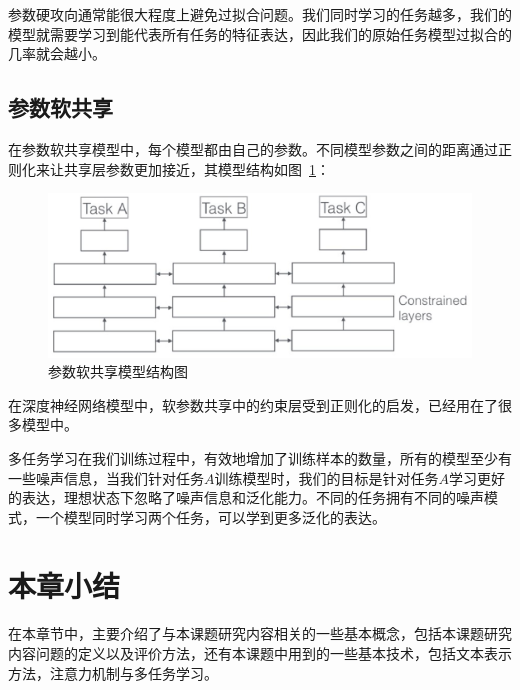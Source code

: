 参数硬攻向通常能很大程度上避免过拟合问题。我们同时学习的任务越多，我们的模型就需要学习到能代表所有任务的特征表达，因此我们的原始任务模型过拟合的几率就会越小。

\subsection{参数软共享}
在参数软共享模型中，每个模型都由自己的参数。不同模型参数之间的距离通过正则化来让共享层参数更加接近，其模型结构如图~\ref{fig:soft_share}：

\begin{figure}[htb]
    \centering
    \includegraphics[scale=0.5, clip=true]{./sources/rel_soft_share.eps}
    \vspace{-10pt}
    \caption{\label{fig:soft_share} 参数软共享模型结构图}
    \vspace{-5pt}
\end{figure}

在深度神经网络模型中，软参数共享中的约束层受到正则化的启发，已经用在了很多模型中。

多任务学习在我们训练过程中，有效地增加了训练样本的数量，所有的模型至少有一些噪声信息，当我们针对任务$A$训练模型时，我们的目标是针对任务$A$学习更好的表达，理想状态下忽略了噪声信息和泛化能力。不同的任务拥有不同的噪声模式，一个模型同时学习两个任务，可以学到更多泛化的表达。

\section{本章小结}
在本章节中，主要介绍了与本课题研究内容相关的一些基本概念，包括本课题研究内容问题的定义以及评价方法，还有本课题中用到的一些基本技术，包括文本表示方法，注意力机制与多任务学习。

